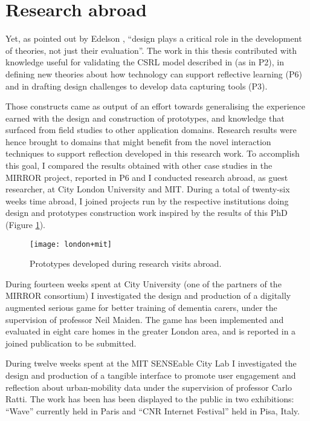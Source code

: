 \section{Research abroad}\label{research-abroad}

Yet, as pointed out by Edelson \autocite*{Edelson:2002kp}, ``design plays a critical role in the development of theories, not just their evaluation''. The work in this thesis contributed with knowledge useful for validating the CSRL model described in \autocite{Krogstie:2013kf} (as in P2), in defining new theories about how technology can support reflective learning (P6) and in drafting design challenges to develop data capturing tools (P3).

Those constructs came as output of an effort towards generalising the experience earned with the design and construction of prototypes, and knowledge that surfaced from field studies to other application domains. Research results were hence brought to domains that might benefit from the novel interaction techniques to support reflection developed in this research work. To accomplish this goal, I compared the results obtained with other case studies in the MIRROR project, reported in P6 and I conducted research abroad, as guest researcher, at City London University and MIT. During a total of twenty-six weeks time abroad, I joined projects run by the respective institutions doing design and prototypes construction work inspired by the results of this PhD (Figure \ref{research-abroad}).

\begin{figure}[tbh] 
	\centering 
	\texttt{[image: london+mit]} 
	\caption{Prototypes developed during research visits abroad.} 
	\label{fig:research-abroad} 
\end{figure}

During fourteen weeks spent at City University (one of the partners of the MIRROR consortium) I investigated the design and production of a digitally augmented serious game for better training of dementia carers, under the supervision of professor Neil Maiden. The game has been implemented and evaluated in eight care homes in the greater London area, and is reported in a joined publication to be submitted.

During twelve weeks spent at the MIT SENSEable City Lab I investigated the design and production of a tangible interface to promote user engagement and reflection about urban-mobility data under the supervision of professor Carlo Ratti. The work has been has been displayed to the public in two exhibitions: ``Wave'' currently held in Paris and ``CNR Internet Festival'' held in Pisa, Italy. 
